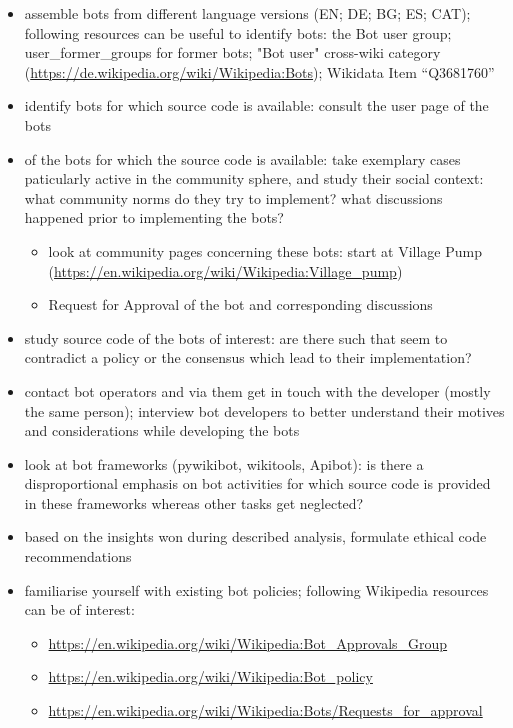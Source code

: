 \documentclass[pdftex,a4paper,11pt]{scrartcl}
\begin{document}
\begin{itemize}
    \item assemble bots from different language versions (EN; DE; BG; ES; CAT); following resources can be useful to identify bots: the Bot user group; user\_former\_groups for former bots; "Bot user" cross-wiki category (\url{https://de.wikipedia.org/wiki/Wikipedia:Bots}); Wikidata Item “Q3681760”
    \item identify bots for which source code is available: consult the user page of the bots
    \item of the bots for which the source code is available: take exemplary cases paticularly active in the community sphere, and study their social context: what community norms do they try to implement? what discussions happened prior to implementing the bots?
    \begin{itemize}
        \item look at community pages concerning these bots: start at Village Pump (\url{https://en.wikipedia.org/wiki/Wikipedia:Village_pump})
        \item Request for Approval of the bot and corresponding discussions
    \end{itemize}
    \item study source code of the bots of interest: are there such that seem to contradict a policy or the consensus which lead to their implementation?
    \item contact bot operators and via them get in touch with the developer (mostly the same person); interview bot developers to better understand their motives and considerations while developing the bots
    \item look at bot frameworks (pywikibot, wikitools, Apibot): is there a disproportional emphasis on bot activities for which source code is provided in these frameworks whereas other tasks get neglected?
    \item based on the insights won during described analysis, formulate ethical code recommendations
    \item familiarise yourself with existing bot policies; following Wikipedia resources can be of interest:
    \begin{itemize}
        \item \url{https://en.wikipedia.org/wiki/Wikipedia:Bot_Approvals_Group}
        \item \url{https://en.wikipedia.org/wiki/Wikipedia:Bot_policy}
        \item \url{https://en.wikipedia.org/wiki/Wikipedia:Bots/Requests_for_approval}
    \end{itemize}
\end{itemize}
\end{document}
